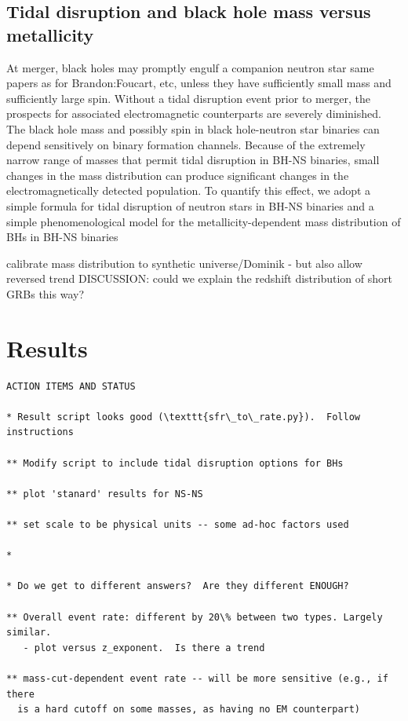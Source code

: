 \documentclass[nofootinbib,twocolumn,prd]{emulateapj}
\newcommand\editremark[1]{{\color{red}#1}}
\begin{document}
\subsection{Tidal disruption and black hole mass versus metallicity}
At merger, black holes may promptly engulf a companion neutron star \editremark{same papers as for Brandon:Foucart,
  etc}, unless they have sufficiently small mass and sufficiently large spin.  Without  a tidal disruption event prior to merger, the prospects for associated electromagnetic counterparts
are severely diminished.  
%
The black hole mass and possibly spin in black hole-neutron star binaries can depend sensitively on binary formation
channels.  Because of the extremely narrow range of masses that permit tidal disruption in BH-NS binaries, small changes
in the mass distribution can produce significant changes in the electromagnetically detected population.
%
To quantify this effect, we adopt a simple formula for tidal disruption of neutron stars in BH-NS binaries and a simple
phenomenological model for the metallicity-dependent mass distribution of BHs in BH-NS binaries




\editremark{calibrate mass distribution to synthetic universe/Dominik - but also allow reversed trend}
DISCUSSION: could we explain the redshift distribution of short GRBs this way?


\section{Results}
\label{sec:results}


\begin{verbatim}
ACTION ITEMS AND STATUS

* Result script looks good (\texttt{sfr\_to\_rate.py}).  Follow instructions

** Modify script to include tidal disruption options for BHs

** plot 'stanard' results for NS-NS

** set scale to be physical units -- some ad-hoc factors used

*

* Do we get to different answers?  Are they different ENOUGH?  

** Overall event rate: different by 20\% between two types. Largely similar.
   - plot versus z_exponent.  Is there a trend

** mass-cut-dependent event rate -- will be more sensitive (e.g., if there
  is a hard cutoff on some masses, as having no EM counterpart)
\end{verbatim}
\end{document}

